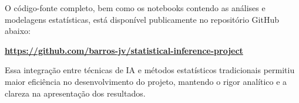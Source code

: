 \documentclass{article}
\begin{document}
O código-fonte completo, bem como os notebooks contendo as análises e modelagens estatísticas, está disponível publicamente no repositório GitHub abaixo:

\begin{center}
	\textbf{\url{https://github.com/barros-jv/statistical-inference-project}}
\end{center}

Essa integração entre técnicas de IA e métodos estatísticos tradicionais permitiu maior eficiência no desenvolvimento do projeto, mantendo o rigor analítico e a clareza na apresentação dos resultados.


\end{document}

